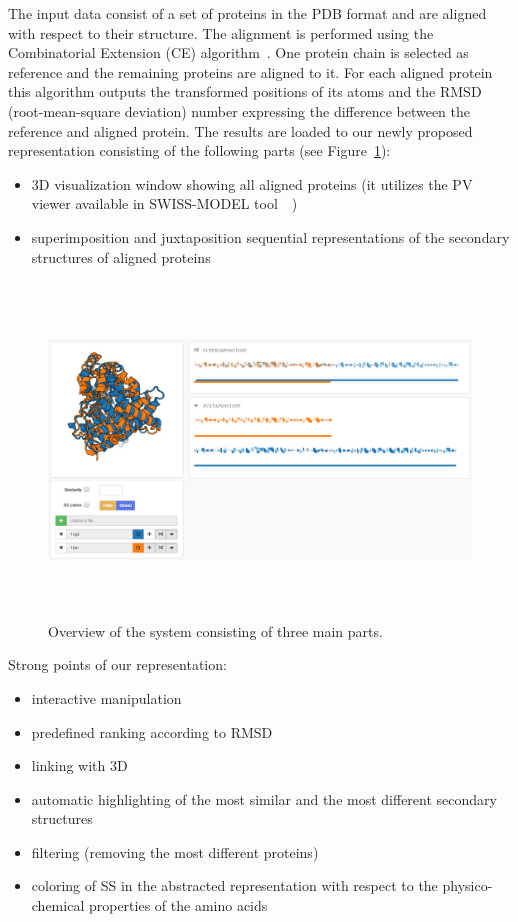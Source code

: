 \documentclass[twocolumn]{bmcart}%
\begin{document}
The input data consist of a set of proteins in the PDB format and are aligned with respect to their structure.
The alignment is performed using the Combinatorial Extension (CE) algorithm~\cite{Shindyalov1998}. 
One protein chain is selected as reference and the remaining proteins are aligned to it.
For each aligned protein this algorithm outputs the transformed positions of its atoms and the RMSD (root-mean-square deviation) number expressing the difference between the reference and aligned protein.  
The results are loaded to our newly proposed representation consisting of the following parts (see Figure~\ref{fig:design}):
\begin{itemize}
\item 3D visualization window showing all aligned proteins (it utilizes the PV viewer available in SWISS-MODEL tool~~\cite{biasini2014})
\item superimposition and juxtaposition sequential representations of the secondary structures of aligned proteins
\end{itemize}



\begin{figure}[t!]
  \centering
  \includegraphics[height=3.5in]{pics/design.png}
  \caption{Overview of the system consisting of three main parts.}
  \label{fig:design}
\end{figure}


Strong points of our representation:
\begin{itemize}
\item interactive manipulation
\item predefined ranking according to RMSD
\item linking with 3D
\item automatic highlighting of the most similar and the most different secondary structures
\item filtering (removing the most different proteins)
\item coloring of SS in the abstracted representation with respect to the physico-chemical properties of the amino acids
\end{itemize}
\end{document}
